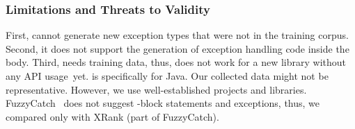 
\subsubsection*{\bf Limitations and Threats to Validity}
First, {\tool} cannot generate new exception types that were not in
the training corpus. Second, it does not support the generation of
exception handling code inside the  body. Third, {\tool}
needs training data, thus, does not work for a new library without any
API usage~yet. {\tool} is specifically for Java. Our collected data
might not be representative. However, we use well-established projects
and libraries. FuzzyCatch~\cite{xrank-fse20} does not
suggest -block statements and exceptions, thus, we compared
only with XRank (part of FuzzyCatch).
